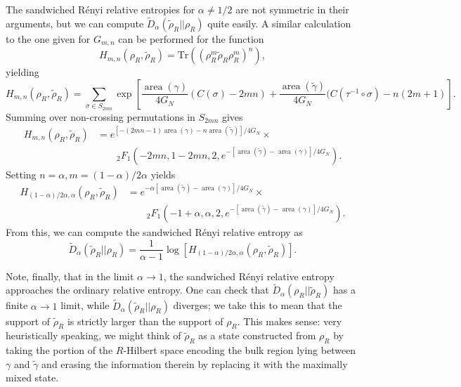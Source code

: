 \documentclass[a4paper,11pt]{article}
\renewcommand{\tr}{\text{Tr}}
\renewcommand{\tilde}{\widetilde}
\newcommand{\area}{\operatorname{area}}
\begin{document}
The sandwiched R\'{e}nyi relative entropies for $\alpha \neq 1/2$ are not symmetric in their arguments, but we can compute $\tilde{D}_{\alpha}(\tilde{\rho}_R || \rho_{R})$ quite easily. A similar calculation to the one given for $G_{m, n}$ can be performed for the function
\begin{equation} \label{eq:H-definition}
    H_{m, n}(\rho_{R}, \tilde{\rho}_{R}) = \tr((\rho_{R}^m \tilde{\rho}_{R} \rho_{R}^m)^n),
\end{equation}
yielding
\begin{equation}
    H_{m, n}(\rho_{R}, \tilde{\rho}_{R}) = \sum_{\sigma \in S_{2 m n}}
        \exp\left[\frac{\area(\gamma)}{4 G_N} (C(\sigma) - 2 m n) + \frac{\area(\tilde{\gamma})}{4 G_N} (C(\tau^{-1} \circ \sigma) - n (2m+1) \right].
\end{equation}
Summing over non-crossing permutations in $S_{2 m n}$ gives
\begin{align}
    H_{m, n} (\rho_R, \tilde{\rho}_R)
        & = e^{[-(2 m n - 1) \area(\gamma)- n \area(\tilde{\gamma})]/4 G_N} \times \nonumber \\
            & \qquad 
            {}_{2} F_1\left( - 2 m n, 1 - 2 m n, 2, e^{- [\area(\tilde{\gamma}) - \area(\gamma)]/4 G_N} \right).
\end{align}
Setting $n = \alpha, m = (1 - \alpha) / 2 \alpha$ yields
\begin{align}
    H_{(1-\alpha)/2 \alpha, \alpha} (\rho_R, \tilde{\rho}_R)
        & = e^{- \alpha [\area(\tilde{\gamma}) - \area(\gamma)] / 4 G_N } \times \nonumber \\
        & \qquad
            {}_{2} F_1\left( - 1 + \alpha, \alpha, 2, e^{- [\area(\tilde{\gamma}) - \area(\gamma)]/4 G_N} \right).
\end{align}
From this, we can compute the sandwiched R\'{e}nyi relative entropy as
\begin{equation} \label{eq:reversed-sandwiched-Renyis}
    \tilde{D}_{\alpha}(\tilde{\rho}_{R} || \rho_R)
        = \frac{1}{\alpha - 1} \log\left[H_{(1-\alpha)/2 \alpha, \alpha}(\rho_R, \tilde{\rho}_{R})  \right].
\end{equation}

Note, finally, that in the limit $\alpha \rightarrow 1$, the sandwiched R\'{e}nyi relative entropy approaches the ordinary relative entropy. One can check that $\tilde{D}_{\alpha}(\rho_R || \tilde{\rho}_{R})$ has a finite $\alpha \rightarrow 1$ limit, while $\tilde{D}_{\alpha}(\tilde{\rho}_R || \rho_{R})$ diverges; we take this to mean that the support of $\tilde{\rho}_{R}$ is strictly larger than the support of $\rho_R$. This makes sense: very heuristically speaking, we might think of $\tilde{\rho}_{R}$ as a state constructed from $\rho_R$ by taking the portion of the $R$-Hilbert space encoding the bulk region lying between $\gamma$ and $\tilde{\gamma}$ and erasing the information therein by replacing it with the maximally mixed state.
\end{document}
